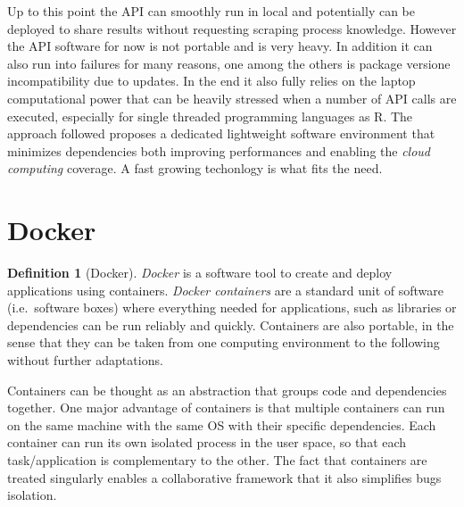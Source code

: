 \documentclass[
  12pt,
  a4paper,
  oneside]{book}
\theoremstyle{definition}
\newtheorem{definition}{Definition}[chapter]
\theoremstyle{definition}
\theoremstyle{definition}
\theoremstyle{remark}
\begin{document}
Up to this point the API can smoothly run in local and potentially can be deployed to share results without requesting scraping process knowledge. However the API software for now is not portable and is very heavy. In addition it can also run into failures for many reasons, one among the others is package versione incompatibility due to updates. In the end it also fully relies on the laptop computational power that can be heavily stressed when a number of API calls are executed, especially for single threaded programming languages as R.
The approach followed proposes a dedicated lightweight software environment that minimizes dependencies both improving performances and enabling the \emph{cloud computing} coverage. A fast growing techonlogy is what fits the need.

\hypertarget{docker}{%
\section{Docker}\label{docker}}

\begin{definition}[Docker]
\protect\hypertarget{def:docker}{}{\label{def:docker} {} }\emph{Docker} \citep{docker} is a software tool to create and deploy applications using containers.
\emph{Docker containers} are a standard unit of software (i.e.~software boxes) where everything needed for applications, such as libraries or dependencies can be run reliably and quickly. Containers are also portable, in the sense that they can be taken from one computing environment to the following without further adaptations.
\end{definition}

Containers can be thought as an abstraction that groups code and dependencies together. One major advantage of containers is that multiple containers can run on the same machine with the same OS with their specific dependencies. Each container can run its own isolated process in the user space, so that each task/application is complementary to the other. The fact that containers are treated singularly enables a collaborative framework that it also simplifies bugs isolation.
\end{document}
